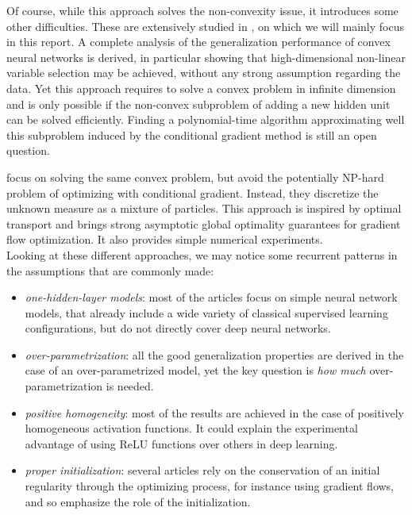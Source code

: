 \documentclass[a4paper, 11pt]{scrartcl}
\begin{document}
{Of course, while this approach solves the non-convexity issue, it introduces some other difficulties. These are extensively studied in \cite{bach2017breaking}, on which we will mainly focus in this report. A complete analysis of the generalization performance of convex neural networks is derived, in particular showing that high-dimensional non-linear variable selection may be achieved, without any strong assumption regarding the data. Yet this approach requires to solve a convex problem in infinite dimension and is only possible if the non-convex subproblem of adding a new hidden unit can be solved efficiently. Finding a polynomial-time algorithm approximating well this subproblem induced by the conditional gradient method is still an open question.

\cite{chizat2018global} focus on solving the same convex problem, but avoid the potentially NP-hard problem of optimizing with conditional gradient. Instead, they discretize the unknown measure as a mixture of particles. This approach is inspired by optimal transport and brings strong asymptotic global optimality guarantees for gradient flow optimization. It also provides simple numerical experiments.\\

Looking at these different approaches, we may notice some recurrent patterns in the assumptions that are commonly made:

\begin{itemize}
\item \textit{one-hidden-layer models}: most of the articles focus on simple neural network models, that already include a wide variety of classical supervised learning configurations, but do not directly cover deep neural networks.
\item \textit{over-parametrization}: all the good generalization properties are derived in the case of an over-parametrized model, yet the key question is \textit{how much} over-parametrization is needed.
\item \textit{positive homogeneity}: most of the results are achieved in the case of positively homogeneous activation functions. It could explain the experimental advantage of using ReLU functions over others in deep learning.
\item \textit{proper initialization}: several articles rely on the conservation of an initial regularity through the optimizing process, for instance using gradient flows, and so emphasize the role of the initialization.
\end{itemize}

}
\end{document}
